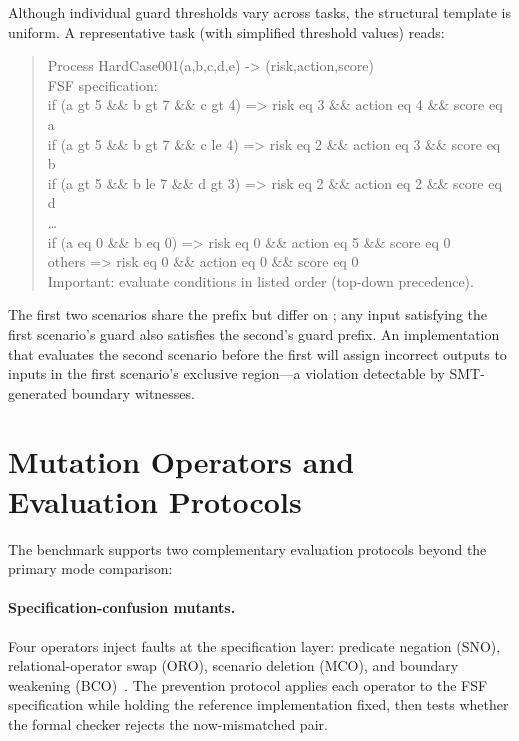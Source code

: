 Although individual guard thresholds vary across tasks, the structural template
is uniform.  A representative task (with simplified threshold values) reads:

\begin{quote}\small\ttfamily
Process HardCase001(a,b,c,d,e) -> (risk,action,score)\\[2pt]
FSF specification:\\
if (a gt 5 \&\& b gt 7 \&\& c gt 4) => risk eq 3 \&\& action eq 4 \&\& score eq a\\
if (a gt 5 \&\& b gt 7 \&\& c le 4) => risk eq 2 \&\& action eq 3 \&\& score eq b\\
if (a gt 5 \&\& b le 7 \&\& d gt 3) => risk eq 2 \&\& action eq 2 \&\& score eq d\\
\ldots\\
if (a eq 0 \&\& b eq 0) => risk eq 0 \&\& action eq 5 \&\& score eq 0\\
others => risk eq 0 \&\& action eq 0 \&\& score eq 0\\[2pt]
Important: evaluate conditions in listed order (top-down precedence).
\end{quote}

The first two scenarios share the prefix  but
differ on ; any input satisfying the first scenario's guard also
satisfies the second's guard prefix.  An implementation that evaluates the
second scenario before the first will assign incorrect outputs to inputs in
the first scenario's exclusive region---a violation detectable by
SMT-generated boundary witnesses.

\section{Mutation Operators and Evaluation Protocols}
\label{sec:bench:mutation}

The benchmark supports two complementary evaluation protocols beyond the
primary mode comparison:

\paragraph{Specification-confusion mutants.}
Four operators inject faults at the specification layer: predicate negation
(SNO), relational-operator swap (ORO), scenario deletion (MCO), and boundary
weakening (BCO)~\citep{demillo1978mutation,offutt2001mutation2000}.  The prevention protocol applies each operator to the FSF
specification while holding the reference implementation fixed, then tests
whether the formal checker rejects the now-mismatched pair.

